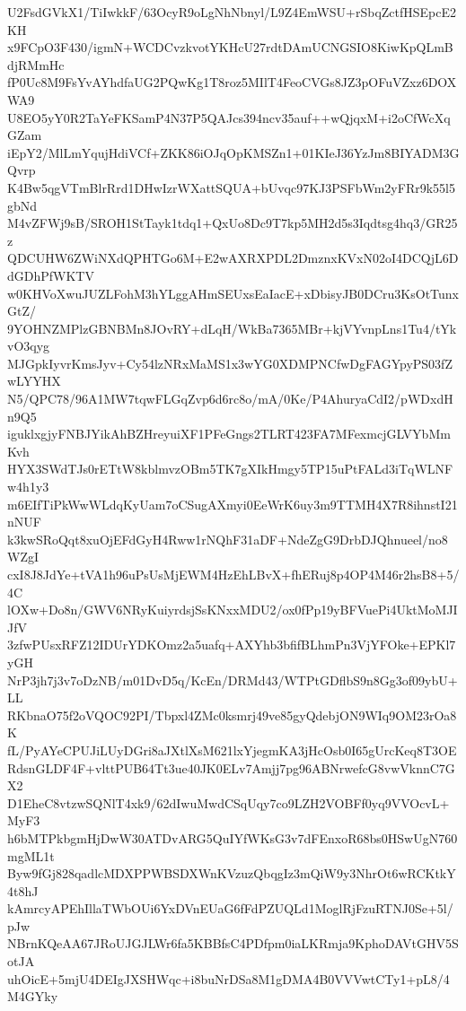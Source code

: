 U2FsdGVkX1/TiIwkkF/63OcyR9oLgNhNbnyl/L9Z4EmWSU+rSbqZctfHSEpcE2KH
x9FCpO3F430/igmN+WCDCvzkvotYKHcU27rdtDAmUCNGSIO8KiwKpQLmBdjRMmHc
fP0Uc8M9FsYvAYhdfaUG2PQwKg1T8roz5MIlT4FeoCVGs8JZ3pOFuVZxz6DOXWA9
U8EO5yY0R2TaYeFKSamP4N37P5QAJcs394ncv35auf++wQjqxM+i2oCfWcXqGZam
iEpY2/MlLmYqujHdiVCf+ZKK86iOJqOpKMSZn1+01KIeJ36YzJm8BIYADM3GQvrp
K4Bw5qgVTmBlrRrd1DHwIzrWXattSQUA+bUvqc97KJ3PSFbWm2yFRr9k55l5gbNd
M4vZFWj9sB/SROH1StTayk1tdq1+QxUo8Dc9T7kp5MH2d5s3Iqdtsg4hq3/GR25z
QDCUHW6ZWiNXdQPHTGo6M+E2wAXRXPDL2DmznxKVxN02oI4DCQjL6DdGDhPfWKTV
w0KHVoXwuJUZLFohM3hYLggAHmSEUxsEaIacE+xDbisyJB0DCru3KsOtTunxGtZ/
9YOHNZMPlzGBNBMn8JOvRY+dLqH/WkBa7365MBr+kjVYvnpLns1Tu4/tYkvO3qyg
MJGpkIyvrKmsJyv+Cy54lzNRxMaMS1x3wYG0XDMPNCfwDgFAGYpyPS03fZwLYYHX
N5/QPC78/96A1MW7tqwFLGqZvp6d6rc8o/mA/0Ke/P4AhuryaCdI2/pWDxdHn9Q5
iguklxgjyFNBJYikAhBZHreyuiXF1PFeGngs2TLRT423FA7MFexmcjGLVYbMmKvh
HYX3SWdTJs0rETtW8kblmvzOBm5TK7gXIkHmgy5TP15uPtFALd3iTqWLNFw4h1y3
m6EIfTiPkWwWLdqKyUam7oCSugAXmyi0EeWrK6uy3m9TTMH4X7R8ihnstI21nNUF
k3kwSRoQqt8xuOjEFdGyH4Rww1rNQhF31aDF+NdeZgG9DrbDJQhnueel/no8WZgI
cxI8J8JdYe+tVA1h96uPsUsMjEWM4HzEhLBvX+fhERuj8p4OP4M46r2hsB8+5/4C
lOXw+Do8n/GWV6NRyKuiyrdsjSsKNxxMDU2/ox0fPp19yBFVuePi4UktMoMJIJfV
3zfwPUsxRFZ12IDUrYDKOmz2a5uafq+AXYhb3bfifBLhmPn3VjYFOke+EPKl7yGH
NrP3jh7j3v7oDzNB/m01DvD5q/KcEn/DRMd43/WTPtGDflbS9n8Gg3of09ybU+LL
RKbnaO75f2oVQOC92PI/Tbpxl4ZMc0ksmrj49ve85gyQdebjON9WIq9OM23rOa8K
fL/PyAYeCPUJiLUyDGri8aJXtlXsM621lxYjegmKA3jHcOsb0I65gUrcKeq8T3OE
RdsnGLDF4F+vlttPUB64Tt3ue40JK0ELv7Amjj7pg96ABNrwefcG8vwVknnC7GX2
D1EheC8vtzwSQNlT4xk9/62dIwuMwdCSqUqy7co9LZH2VOBFf0yq9VVOcvL+MyF3
h6bMTPkbgmHjDwW30ATDvARG5QuIYfWKsG3v7dFEnxoR68bs0HSwUgN760mgML1t
Byw9fGj828qadlcMDXPPWBSDXWnKVzuzQbqgIz3mQiW9y3NhrOt6wRCKtkY4t8hJ
kAmrcyAPEhIllaTWbOUi6YxDVnEUaG6fFdPZUQLd1MoglRjFzuRTNJ0Se+5l/pJw
NBrnKQeAA67JRoUJGJLWr6fa5KBBfsC4PDfpm0iaLKRmja9KphoDAVtGHV5SotJA
uhOicE+5mjU4DEIgJXSHWqc+i8buNrDSa8M1gDMA4B0VVVwtCTy1+pL8/4M4GYky
